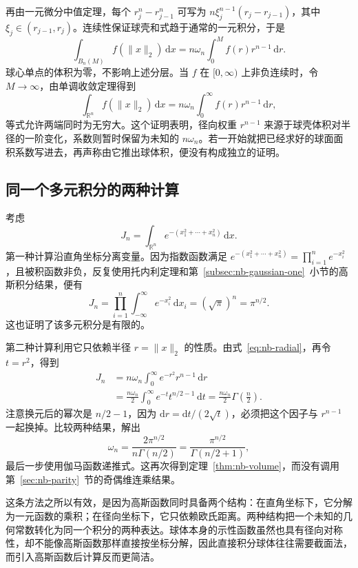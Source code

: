\documentclass[UTF8,12pt,a4paper,fontset=fandol]{ctexart}
\begin{document}
再由一元微分中值定理，每个 $r_j^n-r_{j-1}^n$ 可写为 $n\xi_j^{n-1}(r_j-r_{j-1})$，其中 $\xi_j\in(r_{j-1},r_j)$。连续性保证球壳和式趋于通常的一元积分，于是
\begin{equation}\label{eq:nb-radial-finite}
  \int_{B_n(M)}f(\|x\|_2)\,\mathrm dx
  =n\omega_n\int_0^M f(r)r^{n-1}\,\mathrm dr.
\end{equation}
球心单点的体积为零，不影响上述分层。当 $f$ 在 $[0,\infty)$ 上非负连续时，令 $M\to\infty$，由单调收敛定理得到
\begin{equation}\label{eq:nb-radial}
  \int_{\mathbb R^n}f(\|x\|_2)\,\mathrm dx
  =n\omega_n\int_0^\infty f(r)r^{n-1}\,\mathrm dr,
\end{equation}
等式允许两端同时为无穷大。这个证明表明，径向权重 $r^{n-1}$ 来源于球壳体积对半径的一阶变化，系数则暂时保留为未知的 $n\omega_n$。若一开始就把已经求好的球面面积系数写进去，再声称由它推出球体积，便没有构成独立的证明。

\subsection{同一个多元积分的两种计算}

考虑
\[
  J_n=\int_{\mathbb R^n}e^{-(x_1^2+\cdots+x_n^2)}\,\mathrm dx.
\]
第一种计算沿直角坐标分离变量。因为指数函数满足 $e^{-(x_1^2+\cdots+x_n^2)}=\prod_{i=1}^n e^{-x_i^2}$，且被积函数非负，反复使用托内利定理和第~\ref{subsec:nb-gaussian-one}~小节的高斯积分结果，便有
\begin{equation}\label{eq:nb-gaussian-cartesian}
  J_n=\prod_{i=1}^n\int_{-\infty}^{\infty}e^{-x_i^2}\,\mathrm dx_i
  =(\sqrt\pi)^n=\pi^{n/2}.
\end{equation}
这也证明了该多元积分是有限的。

第二种计算利用它只依赖半径 $r=\|x\|_2$ 的性质。由式~\eqref{eq:nb-radial}，再令 $t=r^2$，得到
\begin{align*}
  J_n
  &=n\omega_n\int_0^\infty e^{-r^2}r^{n-1}\,\mathrm dr\\
  &=\frac{n\omega_n}{2}\int_0^\infty e^{-t}t^{n/2-1}\,\mathrm dt
    =\frac{n\omega_n}{2}\Gamma\!\left(\frac n2\right).
\end{align*}
注意换元后的幂次是 $n/2-1$，因为 $\mathrm dr=\mathrm dt/(2\sqrt t)$，必须把这个因子与 $r^{n-1}$ 一起换掉。比较两种结果，解出
\[
  \omega_n=\frac{2\pi^{n/2}}{n\Gamma(n/2)}
  =\frac{\pi^{n/2}}{\Gamma(n/2+1)},
\]
最后一步使用伽马函数递推式。这再次得到定理~\ref{thm:nb-volume}，而没有调用第~\ref{sec:nb-parity}~节的奇偶维连乘结果。

这条方法之所以有效，是因为高斯函数同时具备两个结构：在直角坐标下，它分解为一元函数的乘积；在径向坐标下，它只依赖欧氏距离。两种结构把一个未知的几何常数转化为同一个积分的两种表达。球体本身的示性函数虽然也具有径向对称性，却不能像高斯函数那样直接按坐标分解，因此直接积分球体往往需要截面法，而引入高斯函数后计算反而更简洁。
\end{document}
